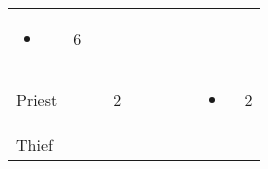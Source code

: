 \documentclass[12pt]{article}
\begin{document}
\begin{longtable}[]{@{}llllllllll@{}}
\begin{minipage}[t]{0.07\columnwidth}
\begin{itemize}
\item
\end{itemize}
\strut\end{minipage} &
\begin{minipage}[t]{0.08\columnwidth}\raggedright\strut
6
\strut\end{minipage}\tabularnewline
\begin{minipage}[t]{0.13\columnwidth}\raggedright\strut
Priest
\strut\end{minipage} &
\begin{minipage}[t]{0.06\columnwidth}\raggedright\strut
\strut\end{minipage} &
\begin{minipage}[t]{0.06\columnwidth}\raggedright\strut
\strut\end{minipage} &
\begin{minipage}[t]{0.06\columnwidth}\raggedright\strut
2
\strut\end{minipage} &
\begin{minipage}[t]{0.06\columnwidth}\raggedright\strut
\strut\end{minipage} &
\begin{minipage}[t]{0.06\columnwidth}\raggedright\strut
\strut\end{minipage} &
\begin{minipage}[t]{0.06\columnwidth}\raggedright\strut
\strut\end{minipage} &
\begin{minipage}[t]{0.06\columnwidth}\raggedright\strut
\strut\end{minipage} &
\begin{minipage}[t]{0.07\columnwidth}\raggedright\strut
\begin{itemize}
\item
\end{itemize}
\strut\end{minipage} &
\begin{minipage}[t]{0.08\columnwidth}\raggedright\strut
2
\strut\end{minipage}\tabularnewline
\begin{minipage}[t]{0.13\columnwidth}\raggedright\strut
Thief
\strut\end{minipage} &
\begin{minipage}[t]{0.06\columnwidth}\raggedright\strut
\strut\end{minipage} &
\begin{minipage}[t]{0.06\columnwidth}\raggedright\strut
\strut\end{minipage} &
\begin{minipage}[t]{0.06\columnwidth}\raggedright\strut

\end{minipage}
\end{longtable}
\end{document}
